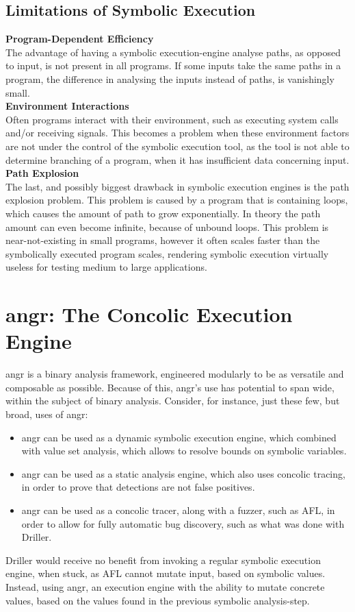 \documentclass[a4paper]{article}
\newcommand{\tbf}[1]{\textbf{#1}}
\newcommand{\subsubsubsection}[1]{\tbf{#1}\\}
\begin{document}
\subsection{Limitations of Symbolic Execution}
\label{sec:LimitsSymEx}
\subsubsubsection{Program-Dependent Efficiency}
The advantage of having a symbolic execution-engine analyse paths, as opposed to input, is not present in all programs. If some inputs take the same paths in a program, the difference in analysing the inputs instead of paths, is vanishingly small.\\
\subsubsubsection{Environment Interactions}
Often programs interact with their environment, such as executing system calls and/or receiving signals. This becomes a problem when these environment factors are not under the control of the symbolic execution tool, as the tool is not able to determine branching of a program, when it has insufficient data concerning input.\\
\subsubsubsection{Path Explosion}
The last, and possibly biggest drawback in symbolic execution engines is the path explosion problem. This problem is caused by a program that is containing loops, which causes the amount of path to grow exponentially. In theory the path amount can even become infinite, because of unbound loops. This problem is near-not-existing in small programs, however it often scales faster than the symbolically executed program scales, rendering symbolic execution virtually useless for testing medium to large applications.
\section{angr: The Concolic Execution Engine}
\label{sec:angr}
angr is a binary analysis framework, engineered modularly to be as versatile and composable as possible. Because of this, angr's use has potential to span wide, within the subject of binary analysis. Consider, for instance, just these few, but broad, uses of angr:
\begin{itemize}
	\item angr can be used as a dynamic symbolic execution engine, which combined with value set analysis, which allows to resolve bounds on symbolic variables.
	\item angr can be used as a static analysis engine, which also uses concolic tracing, in order to prove that detections are not false positives.
	\item angr can be used as a concolic tracer, along with a fuzzer, such as AFL, in order to allow for fully automatic bug discovery, such as what was done with Driller.
\end{itemize}
Driller would receive no benefit from invoking a regular symbolic execution engine, when stuck, as AFL cannot mutate input, based on symbolic values. Instead, using angr, an execution engine with the ability to mutate concrete values, based on the values found in the previous symbolic analysis-step.
\end{document}
